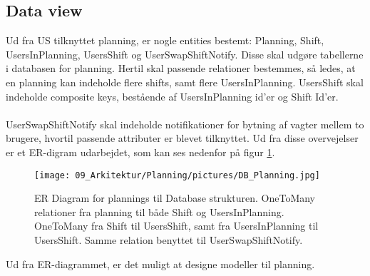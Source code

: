 \subsection{Data view}

\noindent Ud fra US tilknyttet planning, er nogle entities bestemt: Planning, Shift, UsersInPlanning, UsersShift og UserSwapShiftNotify. Disse skal udgøre tabellerne i databasen for planning. Hertil skal passende relationer bestemmes, så ledes, at en planning kan indeholde flere shifts, samt flere UsersInPlanning. UsersShift skal indeholde composite keys, bestående af UsersInPlanning id'er og Shift Id'er. 
\\ \\ 
UserSwapShiftNotify skal indeholde notifikationer for bytning af vagter mellem to brugere, hvortil passende attributer er blevet tilknyttet. Ud fra disse overvejelser er et ER-digram udarbejdet, som kan ses nedenfor på figur \ref{fig:ark_planning_data_dbview}.

\begin{figure}[H]
  \texttt{[image: 09\_Arkitektur/Planning/pictures/DB\_Planning.jpg]}
  \caption{ER Diagram for plannings til Database strukturen. OneToMany relationer fra planning til både Shift og UsersInPlanning. OneToMany fra Shift til UsersShift, samt fra UsersInPlanning til UsersShift. Samme relation benyttet til UserSwapShiftNotify.}
  \label{fig:ark_planning_data_dbview}
\end{figure}

\noindent Ud fra ER-diagrammet, er det muligt at designe modeller til planning.